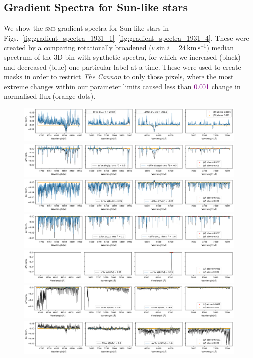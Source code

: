 \documentclass[
  journal=pasa,
  manuscript=research-paper, %
  year=2021,
  volume=37,
]{cup-journal}
\newcommand{\SB}[1]{{\textcolor{purple}{#1}}}
\newcommand{\TheCannon}{\textit{The Cannon}\xspace}
\newcommand{\sme}{\textsc{sme}\xspace}
\newcommand{\kms}{\,\mathrm{km\,s^{-1}}}	%
\begin{document}
\subsection{Gradient Spectra for Sun-like stars}

We show the \sme gradient spectra for Sun-like stars in Figs.~\ref{fig:gradient_spectra_1931_1}--\ref{fig:gradient_spectra_1931_4}. These were created by a comparing rotationally broadened ($v \sin i = 24\kms$) median spectrum of the 3D bin with synthetic spectra, for which we increased (black) and decreased (blue) one particular label at a time. These were used to create masks in order to restrict \TheCannon to only those pixels, where the most extreme changes within our parameter limits caused less than \SB{0.001} change in normalised flux (orange dots).

\begin{figure}[h!]
 \centering
 \includegraphics[width=\textwidth]{figures/gradient_spectrum_1931_teff.png}
 \includegraphics[width=\textwidth]{figures/gradient_spectrum_1931_logg.png}
 \includegraphics[width=\textwidth]{figures/gradient_spectrum_1931_fe_h.png}
  \includegraphics[width=\textwidth]{figures/gradient_spectrum_1931_vmic.png}
 \includegraphics[width=\textwidth]{figures/gradient_spectrum_1931_li_fe.png}
 \includegraphics[width=\textwidth]{figures/gradient_spectrum_1931_c_fe.png}
 \includegraphics[width=\textwidth]{figures/gradient_spectrum_1931_n_fe.png}


\end{figure}
\end{document}
